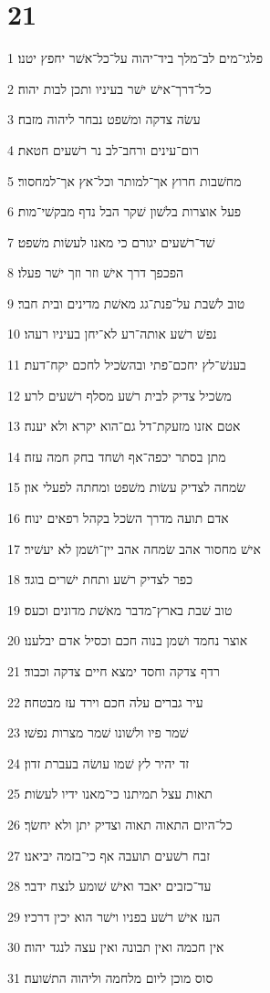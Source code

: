 \chapter{21}

\par 1 פלגי־מים לב־מלך ביד־יהוה על־כל־אשׁר יחפץ יטנו׃
\par 2 כל־דרך־אישׁ ישׁר בעיניו ותכן לבות יהוה׃
\par 3 עשׂה צדקה ומשׁפט נבחר ליהוה מזבח׃
\par 4 רום־עינים ורחב־לב נר רשׁעים חטאת׃
\par 5 מחשׁבות חרוץ אך־למותר וכל־אץ אך־למחסור׃
\par 6 פעל אוצרות בלשׁון שׁקר הבל נדף מבקשׁי־מות׃
\par 7 שׁד־רשׁעים יגורם כי מאנו לעשׂות משׁפט׃
\par 8 הפכפך דרך אישׁ וזר וזך ישׁר פעלו׃
\par 9 טוב לשׁבת על־פנת־גג מאשׁת מדינים ובית חבר׃
\par 10 נפשׁ רשׁע אותה־רע לא־יחן בעיניו רעהו׃
\par 11 בענשׁ־לץ יחכם־פתי ובהשׂכיל לחכם יקח־דעת׃
\par 12 משׂכיל צדיק לבית רשׁע מסלף רשׁעים לרע׃
\par 13 אטם אזנו מזעקת־דל גם־הוא יקרא ולא יענה׃
\par 14 מתן בסתר יכפה־אף ושׁחד בחק חמה עזה׃
\par 15 שׂמחה לצדיק עשׂות משׁפט ומחתה לפעלי און׃
\par 16 אדם תועה מדרך השׂכל בקהל רפאים ינוח׃
\par 17 אישׁ מחסור אהב שׂמחה אהב יין־ושׁמן לא יעשׁיר׃
\par 18 כפר לצדיק רשׁע ותחת ישׁרים בוגד׃
\par 19 טוב שׁבת בארץ־מדבר מאשׁת מדונים וכעס׃
\par 20 אוצר נחמד ושׁמן בנוה חכם וכסיל אדם יבלענו׃
\par 21 רדף צדקה וחסד ימצא חיים צדקה וכבוד׃
\par 22 עיר גברים עלה חכם וירד עז מבטחה׃
\par 23 שׁמר פיו ולשׁונו שׁמר מצרות נפשׁו׃
\par 24 זד יהיר לץ שׁמו עושׂה בעברת זדון׃
\par 25 תאות עצל תמיתנו כי־מאנו ידיו לעשׂות׃
\par 26 כל־היום התאוה תאוה וצדיק יתן ולא יחשׂך׃
\par 27 זבח רשׁעים תועבה אף כי־בזמה יביאנו׃
\par 28 עד־כזבים יאבד ואישׁ שׁומע לנצח ידבר׃
\par 29 העז אישׁ רשׁע בפניו וישׁר הוא יכין דרכיו׃
\par 30 אין חכמה ואין תבונה ואין עצה לנגד יהוה׃
\par 31 סוס מוכן ליום מלחמה וליהוה התשׁועה׃

